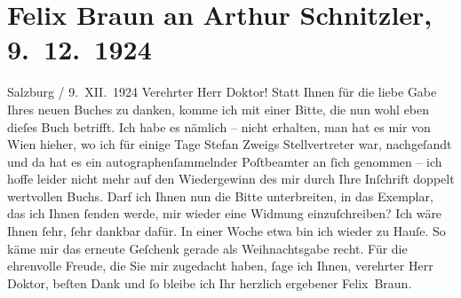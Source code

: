 

         
         \renewcommand{\erwaehntePersonen}{Personen: Felix Braun, Stefan Zweig}
         \renewcommand{\erwaehnteOrte}{Orte: Salzburg, Wien}
         \renewcommand{\erwaehnteWerke}{Werke: Fräulein Else}
               \section[Felix Braun an Arthur Schnitzler, 9. 12. 1924]{ Felix Braun an Arthur Schnitzler, 9. 12. 1924}\nopagebreak{}\rehead{ }\begin{ledgroupsized}[t]{13cm}\normalsize\beginnumbering \toendnotes[C]{\smallbreak\pagebreak[2]} 
\toendnotes[C]{\smallbreak}\pstart
           \centering{}{\pb}Salzburg / 9. XII. 1924\pend
           \pstart{}Verehrter Herr Doktor!\pend\pstart
           Statt Ihnen für die liebe Gabe Ihres neuen Buches zu danken, komme ich mit einer Bitte, die nun wohl
               eben dieſes Buch betrifft. Ich
               habe es nämlich – nicht erhalten, man hat es mir von Wien hieher, wo ich für einige Tage Stefan
                  Zweigs Stellvertreter war, nachgeſandt und da hat es ein
               autographenſammelnder Poſtbeamter an ſich genommen – ich hoffe leider nicht mehr auf
               den Wiedergewinn des mir durch Ihre Inſchrift doppelt wertvollen Buchs. Darf ich Ihnen nun die Bitte
               unterbreiten, in das Exemplar, das ich Ihnen ſenden werde, mir wieder eine Widmung
               einzuſchreiben? Ich wäre Ihnen ſehr, ſehr dankbar dafür. In einer Woche etwa bin ich
               wieder zu Hauſe. {\pb}So käme mir das erneute Geſchenk
               gerade als Weihnachtsgabe recht.\pend
           \pstart
           Für die ehrenvolle Freude, die Sie mir zugedacht haben, ſage ich Ihnen, verehrter
               Herr Doktor, beſten Dank und ſo bleibe ich Ihr herzlich ergebener\pend
           \pstart \spacefill\mbox{Felix Braun.}\pend{}
         

\end{ledgroupsized}
